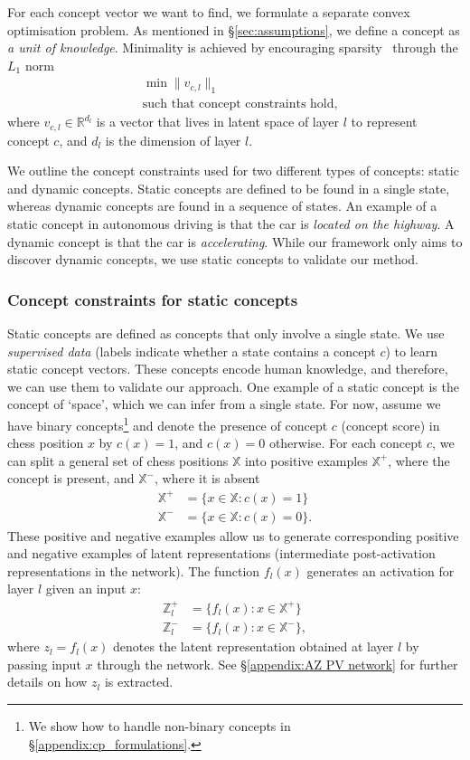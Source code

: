\documentclass{article}
\def\Xset{\mathbb{X}}
\def\Zset{\mathbb{Z}}
\begin{document}
For each concept vector we want to find, we formulate a separate convex optimisation problem. As mentioned in \S\ref{sec:assumptions}, we define a concept as \textit{a unit of knowledge}. Minimality is achieved by encouraging sparsity~\citep{tibshirani1996regression} through the $L_1$ norm 
\begin{align}
    & \min \| v_{c,l} \|_1 \nonumber  \\
    & \text{such that concept constraints hold},
\end{align}
where $v_{c,l} \in \mathbb{R}^{d_{l}}$ is a vector that lives in latent space of layer $l$ to represent concept $c$, and $d_l$ is the dimension of layer $l$. 

We outline the concept constraints used for two different types of concepts: static and dynamic concepts.
Static concepts are defined to be found in a single state, whereas dynamic concepts are found in a sequence of states. An example of a static concept in autonomous driving is that the car is \textit{located on the highway}. A dynamic concept is that the car is \textit{accelerating}. While our framework only aims to discover dynamic concepts, we use static concepts to validate our method. 

\subsubsection{Concept constraints for static concepts}\label{sec:cp_static_concept}
Static concepts are defined as concepts that only involve a single state. We use \textit{supervised data} (labels indicate whether a state contains a concept $c$) to learn static concept vectors. These concepts encode human knowledge, and therefore, we can use them to validate our approach.
One example of a static concept is the concept of `space', which we can infer from a single state. For now, assume we have binary concepts\footnote{We show how to handle non-binary concepts in \S\ref{appendix:cp_formulations}.} and denote the presence of concept $c$ (concept score) in chess position $x$ by $c(x)=1$, and $c(x)=0$ otherwise. For each concept $c$, we can split a general set of chess positions $\Xset$ into positive examples $\Xset^+$, where the concept is present, and $\Xset^-$, where it is absent
\begin{align*}
    \Xset^+ &= \{x\in \Xset: c(x) = 1\}\\
    \Xset^- &= \{x\in \Xset: c(x) = 0\}.
\end{align*}
These positive and negative examples allow us to generate corresponding positive and negative examples of latent representations (intermediate post-activation representations in the network). The function $f_l(x)$ generates an activation for layer $l$ given an input $x$:
\begin{align*}
    \Zset^+_l &= \{f_l(x): x\in \Xset^+\}\\
    \Zset^-_l &= \{f_l(x): x\in \Xset^-\},
\end{align*}
where $z_l = f_l(x)$ denotes the latent representation obtained at layer $l$ by passing input $x$ through the network. See \S\ref{appendix:AZ PV network} for further details on how $z_l$ is extracted. 
\end{document}
